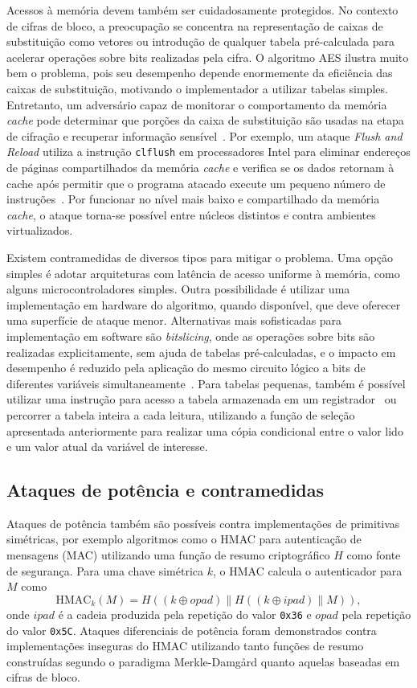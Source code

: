 \documentclass{SBCbookchapter}
\begin{document}
Acessos à memória devem também ser cuidadosamente protegidos. No contexto de cifras de bloco, a preocupação
se concentra na representação de caixas de substituição como vetores ou introdução de qualquer tabela
pré-calculada para acelerar operações sobre bits realizadas pela cifra. O algoritmo AES ilustra muito bem o problema,
pois seu desempenho depende enormemente da eficiência das caixas de substituição, motivando o implementador
a utilizar tabelas simples. Entretanto, um adversário capaz de monitorar o comportamento da memória \emph{cache}
pode determinar que porções da caixa de substituição são usadas na etapa de cifração e recuperar
informação sensível~\cite{Bernstein04, Percival05, Bonneau06, TromerOS10}.
Por exemplo, um ataque \emph{Flush and Reload} utiliza a instrução \texttt{clflush} em processadores Intel
para eliminar endereços de páginas compartilhados da memória \emph{cache} e verifica se os dados retornam à cache
após permitir que o programa atacado execute um pequeno número de instruções~\cite{YaromF14}. Por funcionar no nível
mais baixo e compartilhado da memória \emph{cache}, o ataque torna-se possível entre núcleos distintos e contra ambientes virtualizados.

Existem contramedidas de diversos tipos para mitigar o problema. Uma opção simples é adotar
arquiteturas com latência de acesso uniforme à memória, como alguns microcontroladores simples.
Outra possibilidade é utilizar uma implementação em hardware do algoritmo, quando disponível, que deve oferecer uma superfície de ataque menor.
Alternativas mais sofisticadas para implementação em software são \emph{bitslicing}, onde as operações sobre bits são realizadas explicitamente,
sem ajuda de tabelas pré-calculadas, e o impacto em desempenho é reduzido pela aplicação do mesmo circuito lógico
a bits de diferentes variáveis simultaneamente~\cite{Biham97a,KasperS09}. Para tabelas pequenas, também é possível
utilizar uma instrução para acesso a tabela armazenada em um registrador~\cite{Hamburg09} ou
percorrer a tabela inteira a cada leitura, utilizando a função de seleção apresentada anteriormente
para realizar uma cópia condicional entre o valor lido e um valor atual da variável de interesse.

\subsection{Ataques de potência e contramedidas}

Ataques de potência também são possíveis contra implementações de primitivas simétricas, por exemplo algoritmos como o HMAC para autenticação de mensagens (MAC) utilizando uma função de resumo criptográfico $H$ como fonte de segurança. Para uma chave simétrica $k$, o HMAC calcula o autenticador para $M$ como
\[ \text{HMAC}_k(M) = H((k \oplus opad)\parallel H((k \oplus ipad) \parallel M)),\]
onde $ipad$ é a cadeia produzida pela repetição do valor \texttt{0x36} e $opad$ pela repetição do valor \texttt{0x5C}.
Ataques diferenciais de potência foram demonstrados contra implementações inseguras do HMAC utilizando tanto funções de resumo
construídas segundo o paradigma Merkle-Damg\aa rd quanto aquelas baseadas em cifras de bloco.
\end{document}
